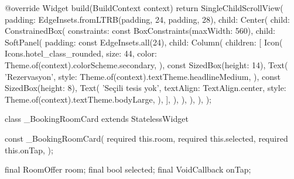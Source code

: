 \documentclass[11pt,a4paper]{article}
\begin{document}
\begin{codeblock}
{  @override
  Widget build(BuildContext context) {
    return SingleChildScrollView(
      padding: EdgeInsets.fromLTRB(padding, 24, padding, 28),
      child: Center(
        child: ConstrainedBox(
          constraints: const BoxConstraints(maxWidth: 560),
          child: SoftPanel(
            padding: const EdgeInsets.all(24),
            child: Column(
              children: [
                Icon(
                  Icons.hotel_class_rounded,
                  size: 44,
                  color: Theme.of(context).colorScheme.secondary,
                ),
                const SizedBox(height: 14),
                Text(
                  'Rezervasyon',
                  style: Theme.of(context).textTheme.headlineMedium,
                ),
                const SizedBox(height: 8),
                Text(
                  'Seçili tesis yok',
                  textAlign: TextAlign.center,
                  style: Theme.of(context).textTheme.bodyLarge,
                ),
              ],
            ),
          ),
        ),
      ),
    );
  }
}

class _BookingRoomCard extends StatelessWidget {
  const _BookingRoomCard({
    required this.room,
    required this.selected,
    required this.onTap,
  });

  final RoomOffer room;
  final bool selected;
  final VoidCallback onTap;

}
\end{codeblock}
\end{document}
